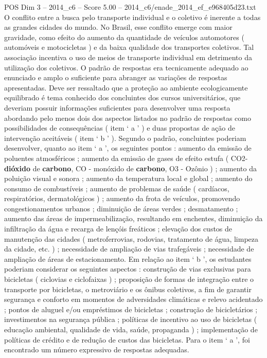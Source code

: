 \begin{textsample}{POS Dim 3 – 2014\_c6 – Score 5.00 – 2014\_c6/enade\_2014\_ef\_e968405d23.txt}
O conflito entre a busca pelo transporte individual e o coletivo é inerente a todas as grandes cidades do mundo.
No Brasil, esse conflito emerge com maior gravidade, como efeito do aumento da quantidade de veículos automotores ( automóveis e motocicletas ) e da baixa qualidade dos transportes coletivos.
Tal associação incentiva o uso de meios de transporte individual em detrimento da utilização dos coletivos.
O padrão de respostas era tecnicamente adequado ao enunciado e amplo o suficiente para abranger as variações de respostas apresentadas.
Deve ser ressaltado que a proteção ao ambiente ecologicamente equilibrado é tema conhecido dos concluintes dos cursos universitários, que deveriam possuir informações suficientes para desenvolver uma resposta abordando pelo menos dois dos aspectos listados no padrão de respostas como possibilidades de consequências ( item ‘ a ’ ) e duas propostas de ação de intervenção aceitáveis ( item ‘ b ’ ).
Segundo o padrão, concluintes poderiam desenvolver, quanto ao item ‘ a ’, os seguintes pontos : aumento da emissão de poluentes atmosféricos ; aumento da emissão de gases de efeito estufa ( CO2- \textbf{dióxido} de \textbf{carbono}, CO - monóxido de \textbf{carbono}, O3 - Ozônio ) ; aumento da poluição visual e sonora ; aumento da temperatura local e global ; aumento do consumo de combustíveis ; aumento de problemas de saúde ( cardíacos, respiratórios, dermatológicos ) ; aumento da frota de veículos, promovendo congestionamentos urbanos ; diminuição de áreas verdes ; desmatamento ; aumento das áreas de impermeabilização, resultando em enchentes, diminuição da infiltração da água e recarga de lençóis freáticos ; elevação dos custos de manutenção das cidades ( metroferrovias, rodovias, tratamento de água, limpeza da cidade, etc. ) ; necessidade de ampliação de vias trafegáveis ; necessidade de ampliação de áreas de estacionamento.
Em relação ao item ‘ b ’, os estudantes poderiam considerar os seguintes aspectos : construção de vias exclusivas para bicicletas ( ciclovias e ciclofaixas ) ; proposição de formas de integração entre o transporte por bicicletas, o metroviário e os ônibus coletivos, a fim de garantir segurança e conforto em momentos de adversidades climáticas e relevo acidentado ; pontos de aluguel e/ou empréstimos de bicicletas ; construção de bicicletários ; investimentos na segurança pública ; políticas de incentivo ao uso de bicicletas ( educação ambiental, qualidade de vida, saúde, propaganda ) ; implementação de políticas de crédito e de redução de custos das bicicletas.
Para o item ‘ a ’, foi encontrado um número expressivo de respostas adequadas.

\end{textsample}
